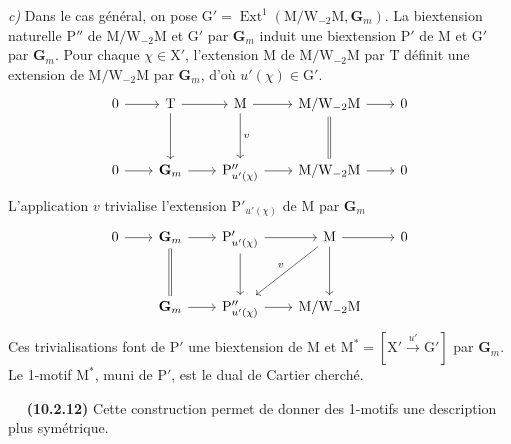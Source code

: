 \documentclass[11pt,leqno]{article}
\newcommand{\Page}[1]{\ifvmode\noindent\else\unskip\ \fi{\footnotesize\textcolor{gray}{[p.\,#1]}}\ \ignorespaces}
\begin{document}
\textit{c)} Dans le cas général, on pose
\(\mathrm{G}'=\operatorname{Ext}^{1}
(\mathrm{M}/\mathrm{W}_{-2}\mathrm{M},\mathbf{G}_m)\).
La biextension naturelle \(\mathrm{P}''\) de
\(\mathrm{M}/\mathrm{W}_{-2}\mathrm{M}\) et \(\mathrm{G}'\)
par \(\mathbf{G}_m\) induit une biextension \(\mathrm{P}'\)
de \(\mathrm{M}\) et \(\mathrm{G}'\) par \(\mathbf{G}_m\).
Pour chaque \(\chi\in\mathrm{X}'\), l’extension \(\mathrm{M}\)
de \(\mathrm{M}/\mathrm{W}_{-2}\mathrm{M}\) par \(\mathrm{T}\)
définit une extension de
\(\mathrm{M}/\mathrm{W}_{-2}\mathrm{M}\) par \(\mathbf{G}_m\),
d’où \(u'(\chi)\in\mathrm{G}'\).
\[
\begin{tikzcd}[row sep=3em, column sep=2em]
0 \arrow[r] &
\mathrm{T} \arrow[r] \arrow[d] &
\mathrm{M} \arrow[r] \arrow[d, "v"] &
\mathrm{M}/\mathrm{W}_{-2}\mathrm{M}
  \arrow[r] \arrow[d, equal] &
0\\
0 \arrow[r] &
\mathbf{G}_m \arrow[r] &
\mathrm{P}''_{u'(\chi)} \arrow[r] &
\mathrm{M}/\mathrm{W}_{-2}\mathrm{M} \arrow[r] &
0
\end{tikzcd}
\]
L’application \(v\) trivialise l’extension
\(\mathrm{P}'_{u'(\chi)}\) de \(\mathrm{M}\) par \(\mathbf{G}_m\)
\[
\begin{tikzcd}[row sep=3em, column sep=2em]
0 \arrow[r] &
\mathbf{G}_m \arrow[r] \arrow[d, equal] &
\mathrm{P}'_{u'(\chi)} \arrow[r] \arrow[d] &
\mathrm{M} \arrow[r] \arrow[d] \arrow[dl, "v"'] &
0\\
& \mathbf{G}_m \arrow[r] &
\mathrm{P}''_{u'(\chi)} \arrow[r] &
\mathrm{M}/\mathrm{W}_{-2}\mathrm{M} &
\end{tikzcd}
\]
Ces trivialisations font de \(\mathrm{P}'\) une biextension de
\(\mathrm{M}\) et
\(\mathrm{M}^{*}=[\mathrm{X}'\xrightarrow{u'}\mathrm{G}']\)
par \(\mathbf{G}_m\). Le 1-motif \(\mathrm{M}^{*}\), muni de
\(\mathrm{P}'\), est le dual de Cartier cherché.

\Page{68}
\textbf{(10.2.12)} Cette construction permet de donner des
1-motifs une description plus symétrique.
\end{document}
